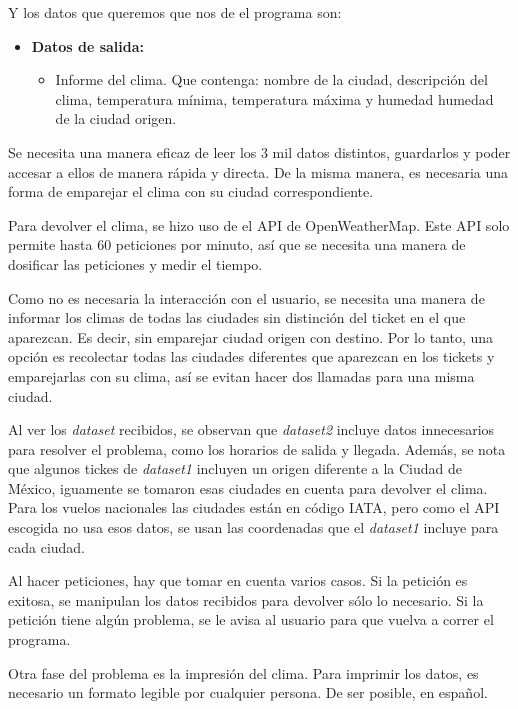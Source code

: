 \documentclass[]{article}
\begin{document}
Y los datos que queremos que nos de el programa son:
\begin{itemize}
	\item \textbf{Datos de salida:}
	\begin{itemize}
		\item Informe del clima. Que contenga: nombre de la ciudad, 
		descripción del clima, temperatura mínima, temperatura máxima y 
		humedad humedad de la ciudad origen.
	\end{itemize}
\end{itemize}

Se necesita una manera eficaz de leer los 3 mil datos distintos, guardarlos y 
poder accesar a ellos de manera rápida y directa. De la misma manera, es 
necesaria una forma de emparejar el clima con su ciudad correspondiente.

Para devolver el clima, se hizo uso de el API de OpenWeatherMap. Este API
solo permite hasta 60 peticiones por minuto, así que se necesita una 
manera de dosificar las peticiones y medir el tiempo.

Como no es necesaria la interacción con el usuario, se necesita 
una manera de informar los climas de todas las ciudades sin distinción del 
ticket en el que aparezcan. Es decir, sin emparejar ciudad origen con 
destino. Por lo tanto, una opción es recolectar todas las ciudades 
diferentes que aparezcan en los tickets y emparejarlas con su clima, así 
se evitan hacer dos llamadas para una misma ciudad.

Al ver los \emph{dataset} recibidos, se observan que \emph{dataset2} incluye 
datos innecesarios para resolver el problema, como los horarios de salida y 
llegada. Además, se nota que algunos tickes de \emph{dataset1} incluyen un 
origen diferente a la Ciudad de México, iguamente se tomaron esas ciudades 
en cuenta para devolver el clima. Para los vuelos nacionales las ciudades 
están en código IATA, pero como el API escogida no usa esos datos, se usan 
las coordenadas que el \emph{dataset1} incluye para cada ciudad. 

Al hacer peticiones, hay que tomar en cuenta varios casos. Si la petición 
es exitosa, se manipulan los datos recibidos para devolver sólo lo 
necesario. Si la petición tiene algún problema, se le avisa al usuario para 
que vuelva a correr el programa. 

Otra fase del problema es la impresión del clima. Para imprimir los datos, es 
necesario un formato legible por cualquier persona. De ser posible, en 
español.
\end{document}
